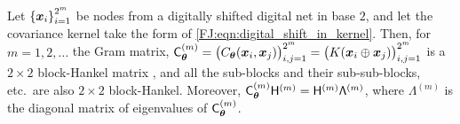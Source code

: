 \documentclass[graybox,footinfo]{svmult}
\begin{document}
\begin{lemma} \label{FJ:lemma:eig}
    Let $\left\{{\boldsymbol{x}}_i \right\}_{i=1}^{2^m}$ be nodes from a digitally shifted digital net in base $2$, and let the covariance kernel take the form of \eqref{FJ:eqn:digital_shift_in_kernel}. Then, for $m = 1, 2, \ldots$ the Gram matrix, $
	\mathsf{C}_{{\boldsymbol{\theta}}}^{(m)} = \bigl(C_{\boldsymbol{\theta}}({\boldsymbol{x}}_i, {\boldsymbol{x}}_j)\bigr)_{i,j=1}^{2^m} = \bigl(K({\boldsymbol{x}}_i \oplus {\boldsymbol{x}}_j)\bigr)_{i,j=1}^{2^m}$ is a $2\times 2$ block-Hankel matrix \cite[Definition 3.1.3]{Ber09a}, and all the sub-blocks and their sub-sub-blocks, etc.\ are also $2\times 2$ block-Hankel. Moreover, $\mathsf{C}_{{\boldsymbol{\theta}}}^{(m)} \mathsf{H}^{(m)} = \mathsf{H}^{(m)} \mathsf{\Lambda}^{(m)}$, where $\mathsf{\Lambda}^{(m)}$ is the diagonal matrix of eigenvalues of $\mathsf{C}_{{\boldsymbol{\theta}}}^{(m)}$.
\end{lemma}
\end{document}
